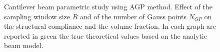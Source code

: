 \begin{figure}
    \quad
    \caption{Cantilever beam parametric study using AGP method. Effect of the sampling window size $R$ and of the number of Gauss points $N_{GP}$ on the structural compliance and the volume fraction. In each graph are reported in green the true theoretical values based on the analytic beam model.}%
    \label{fig:cbGP}%
\end{figure}
